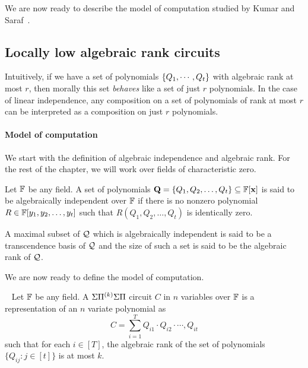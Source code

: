 We are now ready to describe the model of computation studied by Kumar and Saraf~\cite{KS16lowrank}. 

\subsection{Locally low algebraic rank circuits}


Intuitively, if we have a set of polynomials $\left\{Q_1,\cdots, Q_t\right\}$ with algebraic rank at most $r$, then morally this set \emph{behaves} like a set of just $r$ polynomials. In the case of linear independence, any composition on a set of polynomials of rank at most $r$ can be interpreted as a composition on just $r$ polynomials. 

\newpage



\paragraph{Model of computation}
We start with the definition of algebraic independence and algebraic rank. For the rest of the chapter, we will work over fields of characteristic zero. 
\begin{definition}
Let $\mathbb{F}$ be any field. A set of polynomials 
$\mathbf{Q} = \{Q_1, Q_2, \ldots, Q_t\} \subseteq \mathbb{F}[\mathbf{x}]$ is said to be algebraically independent over $\mathbb{F}$ if there is no nonzero polynomial $R \in \mathbb{F}[y_1, y_2, \ldots, y_t]$ such that $R(Q_1, Q_2, \ldots, Q_t)$ is identically zero. 

A maximal subset of $\cal Q$ which is algebraically independent is said to be a transcendence basis of $\cal Q$ and the size of such a set is said to be the algebraic rank of $\cal Q$.
\end{definition}





We are now ready to define the model of computation. 

\begin{definition}~\label{def:lb model}
Let $\mathbb{F}$ be any field. A $\Sigma{\Pi^{(k)}}\Sigma\Pi$ circuit $C$ in $n$ variables over $\mathbb{F}$ is a representation of an $n$ variate polynomial as 
\[C =  \sum_{i = 1}^T  Q_{i1}\cdot  Q_{i2}\cdot  \cdots, Q_{it} \]  
such that for each $i \in [T]$, the algebraic rank of the set of polynomials $\{Q_{ij} : j \in [t]\}$ is at most $k$. 
\end{definition}

